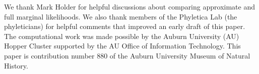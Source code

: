 We thank Mark Holder for helpful discussions about comparing approximate and
full marginal likelihoods.
We also thank  members of the Phyletica Lab (the
phyleticians) for helpful comments that improved an early draft of this paper.
The computational work was made possible by the Auburn University (AU) Hopper
Cluster supported by the AU Office of Information Technology.
This paper is contribution number 880 of the Auburn University
Museum of Natural History.
